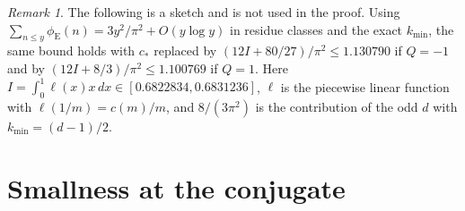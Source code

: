 \documentclass[11pt]{amsart}
\theoremstyle{definition}
\theoremstyle{remark}
\newtheorem{remark}[theorem]{Remark}
\numberwithin{equation}{section}
\newcommand{\eu}{\phi_{\mathrm E}}
\begin{document}
\begin{remark}\label{rem:sharp}
The following is a sketch and is not used in the proof. Using $\sum_{n\le y}\eu(n)=3y^2/\pi^2+O(y\log y)$ in residue
classes and the exact $k_{\min}$, the same bound holds with $c_*$ replaced by $(12I+80/27)/\pi^2\le1.130790$ if $Q=-1$
and by $(12I+8/3)/\pi^2\le1.100769$ if $Q=1$. Here $I=\int_0^1\ell(x)x\,dx\in[0.6822834,0.6831236]$, $\ell$ is the
piecewise linear function with $\ell(1/m)=c(m)/m$, and $8/(3\pi^2)$ is the contribution of the odd $d$ with
$k_{\min}=(d-1)/2$.
\end{remark}

\section{Smallness at the conjugate}\label{sec:conj}
\end{document}
